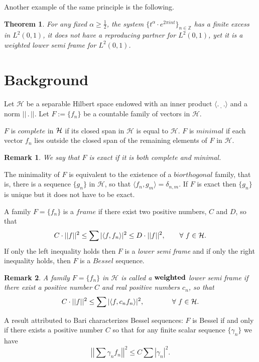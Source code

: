 \documentclass[11pt, a4paper]{article}
\newtheorem{theorem}{Theorem}[section]
\newtheorem{remark}{Remark}[section]
\begin{document}
Another example of the same principle is the following.
\begin{theorem}\cite[Theorem 1.4]{Zikkos2025ACHA}
For any fixed $\alpha\ge\frac{1}{2}$, the system $\{t^{\alpha}\cdot e^{2\pi i n t}\}_{n\in\mathbb{Z}}$ has a finite excess in $L^2(0,1)$,
it does not have a reproducing partner for $L^2 (0,1)$, yet it is a weighted lower semi frame for $L^2 (0,1)$.
\end{theorem}



\section{Background}
\setcounter{equation}{0}


Let $\mathcal{H}$ be a separable Hilbert space endowed with an inner product $\langle .\,  _,\, .\rangle$ and a
norm $||\, .\,  ||$. Let $F:=\{f_n\}$ be a countable family of vectors in $\mathcal{H}$.

$F$ is $complete$ in $\cal H$ if its closed span in $\mathcal{H}$ is equal to $\mathcal{H}$. $F$
is $minimal$ if each vector $f_n$ lies outside the closed span of the remaining elements of $F$ in $\mathcal{H}$.
\begin{remark}
We say that $F$ is exact if it is both complete and minimal.
\end{remark}

The minimality of $F$ is equivalent to the existence of a $biorthogonal$ family,
that is, there is a sequence $\{g_n\}$ in $\mathcal{H}$, so that $\langle f_n , g_m \rangle = \delta_{n,m}$. If $F$ is exact then 
$\{g_n\}$ is unique but it does not have to be exact.


A family $F=\{f_n\}$ is a $frame$ if there exist two positive numbers, $C$ and $D$, so that
\[
C\cdot ||f||^2\le \sum |\langle f, f_n \rangle |^2\le D\cdot ||f||^2,
\qquad \forall\,\, f\in\cal{H}.
\]
If only the left inequality holds then $F$ is a \emph{lower semi frame} and
if only the right inequality holds, then $F$ is a $Bessel$ sequence.

\begin{remark}
A family $F=\{f_n\}$ in $\mathcal{H}$ is called a $\bf weighted$ lower semi frame if there exist a positive number $C$
and real positive numbers $c_n$, so that
\[
C\cdot ||f||^2\le \sum |\langle f, c_n f_n \rangle |^2,\qquad
\qquad \forall\,\, f\in\cal{H}.
\]
\end{remark}

A result attributed to Bari \cite[Chapter 4, Section 2, Theorem 3]{Young} characterizes Bessel sequences:
$F$ is Bessel if and only if there exists a positive number $C$ so that for any finite scalar sequence
$\{\gamma_n\}$ we have
\begin{equation}\label{bessel}
\left|\left|\sum \gamma_n f_n \right|\right|^2 \le C\sum |\gamma_n|^2.
\end{equation}
\end{document}
